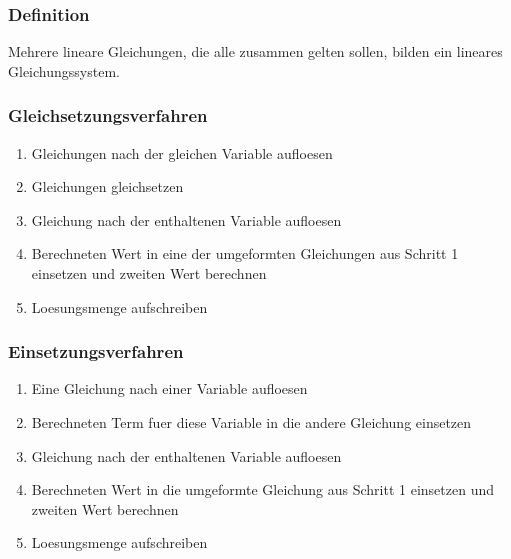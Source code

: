 \begin{multicols}{2}
    \subsubsection{Definition}
    \vspace{-4mm}
    Mehrere lineare Gleichungen, die alle zusammen gelten sollen, bilden ein lineares Gleichungssystem.\\
    \subsubsection{Gleichsetzungsverfahren}
    \vspace{-4mm}
    \begin{enumerate}
        \item Gleichungen nach der gleichen Variable aufloesen
        \item Gleichungen gleichsetzen
        \item Gleichung nach der enthaltenen Variable aufloesen
        \item Berechneten Wert in eine der umgeformten Gleichungen aus Schritt 1 einsetzen und zweiten Wert berechnen
        \item Loesungsmenge aufschreiben
    \end{enumerate}

    \subsubsection{Einsetzungsverfahren}
    \vspace{-4mm}
    \begin{enumerate}
        \item     Eine Gleichung nach einer Variable aufloesen
        \item     Berechneten Term fuer diese Variable in die andere Gleichung einsetzen
        \item     Gleichung nach der enthaltenen Variable aufloesen
        \item     Berechneten Wert in die umgeformte Gleichung aus Schritt 1 einsetzen und zweiten Wert berechnen
        \item     Loesungsmenge aufschreiben
    \end{enumerate}


\end{multicols}
